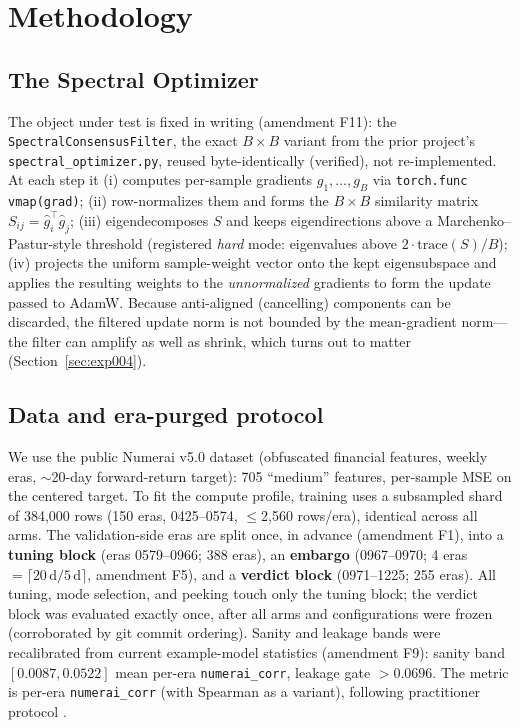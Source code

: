 \section{Methodology}
\label{sec:methodology}

\subsection{The Spectral Optimizer}
\label{sec:method-optimizer}

The object under test is fixed in writing (amendment F11): the
\texttt{SpectralConsensusFilter}, the exact $B \times B$ variant from the
prior project's \texttt{spectral\_optimizer.py}, reused byte-identically
(verified), not re-implemented. At each step it (i) computes per-sample
gradients $g_1,\dots,g_B$ via \texttt{torch.func} \texttt{vmap(grad)};
(ii) row-normalizes them and forms the $B \times B$ similarity matrix
$S_{ij} = \hat g_i^\top \hat g_j$; (iii) eigendecomposes $S$ and keeps
eigendirections above a Marchenko--Pastur-style threshold (registered
\emph{hard} mode: eigenvalues above $2\cdot\mathrm{trace}(S)/B$); (iv)
projects the uniform sample-weight vector onto the kept eigensubspace and
applies the resulting weights to the \emph{unnormalized} gradients to form
the update passed to AdamW. Because anti-aligned (cancelling) components can
be discarded, the filtered update norm is not bounded by the mean-gradient
norm---the filter can amplify as well as shrink, which turns out to matter
(Section~\ref{sec:exp004}).

\subsection{Data and era-purged protocol}
\label{sec:method-data}

We use the public Numerai v5.0 dataset (obfuscated financial features,
weekly eras, $\sim$20-day forward-return target): 705 ``medium'' features,
per-sample MSE on the centered target. To fit the compute profile, training
uses a subsampled shard of 384{,}000 rows (150 eras, 0425--0574,
$\leq$2{,}560 rows/era), identical across all arms. The validation-side eras
are split once, in advance (amendment F1), into a \textbf{tuning block}
(eras 0579--0966; 388 eras), an \textbf{embargo} (0967--0970; 4 eras
$= \lceil 20\,\mathrm{d}/5\,\mathrm{d}\rceil$, amendment F5), and a
\textbf{verdict block} (0971--1225; 255 eras). All tuning, mode selection,
and peeking touch only the tuning block; the verdict block was evaluated
exactly once, after all arms and configurations were frozen (corroborated by
git commit ordering). Sanity and leakage bands were recalibrated from
current example-model statistics (amendment F9): sanity band
$[0.0087, 0.0522]$ mean per-era \texttt{numerai\_corr}, leakage gate
$>0.0696$. The metric is per-era \texttt{numerai\_corr} (with Spearman as a
variant), following practitioner protocol
\citep{numerai_forum2021_eras, numerai_forum2021_fnc}.

